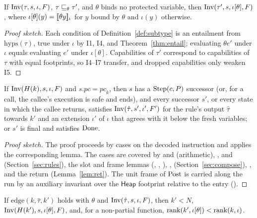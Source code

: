 \begin{lem}\label{lem:weak}
If $\mathrm{Inv}(\tau,s,\iota,F)$, $\tau\sqsubseteq_{\theta}\tau'$, and $\theta$ binds no protected variable, then $\mathrm{Inv}(\tau',s,\iota[\theta],F)$, where $\iota[\theta](y)=[\![\theta y]\!]_{\iota}$ for $y$ bound by $\theta$ and $\iota(y)$ otherwise.
\end{lem}
\begin{proof}[Proof sketch]
Each condition of Definition~\ref{def:subtype} is an entailment from $\mathrm{hyps}(\tau)$, true under $\iota$ by I1, I4, and Theorem~\ref{thm:entail}; evaluating $\theta e'$ under $\iota$ equals evaluating $e'$ under $\iota[\theta]$. Capabilities of $\tau'$ correspond to capabilities of $\tau$ with equal footprints, so I4--I7 transfer, and dropped capabilities only weaken I5.
\end{proof}

\begin{lem}\label{lem:step}
If $\mathrm{Inv}(H(k),s,\iota,F)$ and $s.pc=\mathit{pc}_k$, then $s$ has a $\mathrm{Step}(c,P)$ successor (or, for a call, the callee's execution is safe and ends), and every successor $s'$, or every state in which the callee returns, satisfies $\mathrm{Inv}(\hat\tau,s',\iota',F')$ for the rule's output $\hat\tau$ towards $k'$ and an extension $\iota'$ of $\iota$ that agrees with it below the fresh variables; or $s'$ is final and satisfies $\mathrm{Done}$.
\end{lem}
\begin{proof}[Proof sketch]
The proof proceeds by cases on the decoded instruction and applies the corresponding lemma. The cases are covered by  and  (arithmetic), ,  and  (Section~\ref{sec:rules}), the slot and frame lemmas (, , ), ,  (Section~\ref{sec:compose}), , and the return (Lemma~\ref{lem:ret}). The unit frame of $\mathrm{Post}$ is carried along the run by an auxiliary invariant over the $\mathsf{Heap}$ footprint relative to the entry ().
\end{proof}

\begin{lem}\label{lem:edge}
If $\mathrm{edge}(k,\hat\tau,k')$ holds with $\theta$ and $\mathrm{Inv}(\hat\tau,s,\iota,F)$, then $k'<N$, $\mathrm{Inv}(H(k'),s,\iota[\theta],F)$, and, for a non-partial function, $\mathrm{rank}(k',\iota[\theta])<\mathrm{rank}(k,\iota)$.
\end{lem}

